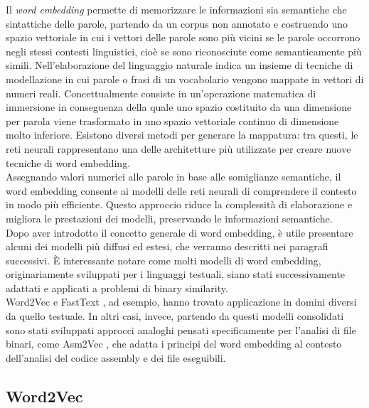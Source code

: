 \documentclass[12pt,a4paper,openright,twoside]{report}
\begin{document}
Il \textit{word embedding} permette di memorizzare le informazioni sia semantiche che sintattiche delle parole, partendo da un corpus non annotato e costruendo uno spazio vettoriale in cui i vettori delle parole sono più vicini se le parole occorrono negli stessi contesti linguistici, cioè se sono riconosciute come semanticamente più simili. Nell'elaborazione del linguaggio naturale indica un insieme di tecniche di modellazione in cui parole o frasi di un vocabolario vengono mappate in vettori di numeri reali. Concettualmente consiste in un'operazione matematica di immersione in conseguenza della quale uno spazio costituito da una dimensione per parola viene trasformato in uno spazio vettoriale continuo di dimensione molto inferiore. Esistono diversi metodi per generare la mappatura: tra questi, le reti neurali rappresentano una delle architetture più utilizzate per creare nuove tecniche di word embedding.\\
Assegnando valori numerici alle parole in base alle somiglianze semantiche, il word embedding consente ai modelli delle reti neurali di comprendere il contesto in modo più efficiente. Questo approccio riduce la complessità di elaborazione e migliora le prestazioni dei modelli, preservando le informazioni semantiche.\\
Dopo aver introdotto il concetto generale di word embedding, è utile presentare alcuni dei modelli più diffusi ed estesi, che verranno descritti nei paragrafi successivi. È interessante notare come molti modelli di word embedding, originariamente sviluppati per i linguaggi testuali, siano stati successivamente adattati e applicati a problemi di binary similarity.\\
Word2Vec \cite{word2vec} e FastText \cite{fastText}, ad esempio, hanno trovato applicazione in domini diversi da quello testuale. In altri casi, invece, partendo da questi modelli consolidati sono stati sviluppati approcci analoghi pensati specificamente per l'analisi di file binari, come Asm2Vec \cite{Asm2Vec}, che adatta i principi del word embedding al contesto dell'analisi del codice assembly e dei file eseguibili.
\newpage

\subsection{Word2Vec}
\end{document}
